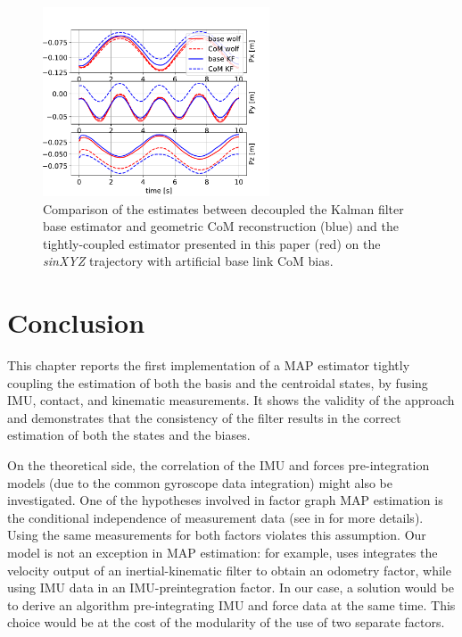 \begin{figure}[t]
    \centering
    \includegraphics[width=0.6\textwidth]{figures/centroidal/base_com_position_wolf_vs_KF.pdf}
    \caption{Comparison of the estimates between decoupled the Kalman filter base estimator and geometric CoM reconstruction (blue) and 
    the tightly-coupled estimator presented in this paper (red) on the \textit{sinXYZ} trajectory with artificial base link CoM bias.}
    \label{fig:comparison_KF_wolf}
\end{figure}




\section{Conclusion}

This chapter reports the first implementation of a MAP estimator tightly coupling the estimation of both the basis and 
the centroidal states, by fusing IMU, contact, and kinematic measurements. It shows the validity of the approach 
and demonstrates that the consistency of the filter results in the correct estimation of both the states and the biases.

On the theoretical side, the correlation of the IMU and forces pre-integration models (due to the common gyroscope data integration) might also be investigated. 
One of the hypotheses involved in factor graph MAP estimation is the conditional independence of measurement data (see  in  for more details).
Using the same measurements for both factors violates this assumption. Our model is not an exception in MAP estimation: for example, \cite{wisth2019robust} uses 
integrates the velocity output of an inertial-kinematic filter to obtain an odometry factor, while using IMU data in an IMU-preintegration factor. In our case,
a solution would be to derive an algorithm pre-integrating IMU and force data at the same time. This choice would be at the cost of the modularity of the 
use of two separate factors.  

